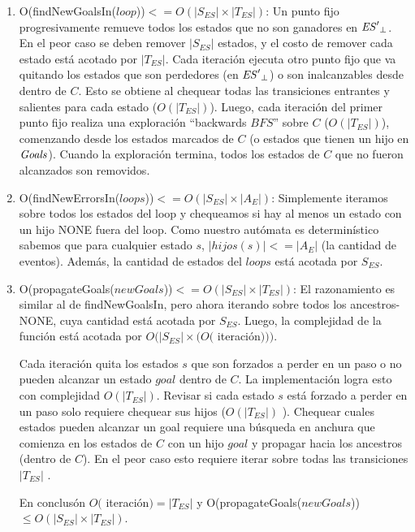 \begin{enumerate}
	\item O(findNewGoalsIn($loop$))$ <= O(|S_{ES}| \times |T_{ES}|)$: 
	Un punto fijo progresivamente remueve todos los estados que no son ganadores en $\mathit{{\mathit{ES}'}_{\bot}}$.
	En el peor caso se deben remover $|S_{ES}|$ estados, y el costo de remover cada estado está acotado por $|T_{ES}|$.
	Cada iteración ejecuta otro punto fijo que va quitando los estados que son perdedores (en $\mathit{{\mathit{ES}'}_{\bot}}$)
	o son inalcanzables desde dentro de $C$.
	Esto se obtiene al chequear todas las transiciones entrantes y salientes para cada estado ($O(|T_{ES}|)$). 
	Luego, cada iteración del primer punto fijo realiza una exploración ``backwards $BFS$'' sobre $C$ ($O(|T_{ES}|)$), comenzando desde los estados marcados de $C$ (o estados que tienen un hijo en $\mathit{Goals}$). Cuando la exploración termina, todos los estados de $C$ que no fueron alcanzados son removidos.
	
	\item O(findNewErrorsIn($loops$))$ <= O(|S_{ES}| \times |A_E|)$: Simplemente iteramos sobre todos los estados del loop y chequeamos si hay al menos un estado con un hijo NONE fuera del loop. Como nuestro autómata es determinístico sabemos que para cualquier estado $s$, 
	$|hijos(s)|<=|A_E|$ (la cantidad de eventos). Además, la cantidad de estados del $loops$ está acotada por $S_{ES}$.
	
	\item O(propagateGoals($newGoals$))$ <= O(|S_{ES}| \times |T_{ES}|)$: 
	El razonamiento es similar al de findNewGoalsIn, pero ahora iterando sobre todos los ancestros-NONE, cuya cantidad está acotada por $S_{ES}$. Luego, la complejidad de la función está acotada por $O(|S_{ES}| \times (O($ 
	iteración$)))$. 
	
	Cada iteración quita los estados $s$ que son forzados a perder en un paso o no pueden alcanzar un estado $goal$ dentro de $C$. La
	implementación logra esto con complejidad $O(|T_{ES}|)$. Revisar si cada estado $s$ está forzado a perder en un paso solo requiere chequear sus hijos ($O(|T_{ES}|)$ ). Chequear cuales estados pueden alcanzar un goal requiere una búsqueda en anchura que comienza en los estados de $C$ con un hijo $goal$ y propagar hacia los ancestros (dentro de $C$).
	En el peor caso esto requiere iterar sobre todas las transiciones $|T_{ES}|$ .
	
	En conclusón $O($ iteración$) = |T_{ES}|$  y O(propagateGoals($newGoals$))$ \leq O(|S_{ES}| \times 
	|T_{ES}|)$.
	

\end{enumerate}
